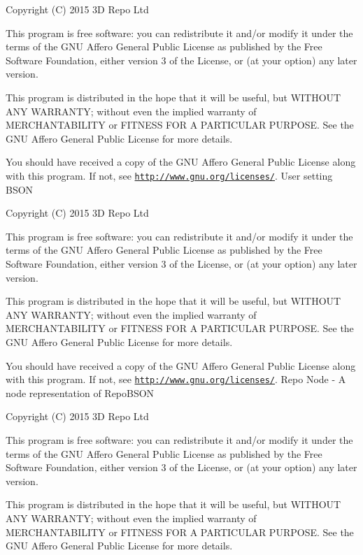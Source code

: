 Copyright (C) 2015 3\+D Repo Ltd

This program is free software\+: you can redistribute it and/or modify it under the terms of the G\+N\+U Affero General Public License as published by the Free Software Foundation, either version 3 of the License, or (at your option) any later version.

This program is distributed in the hope that it will be useful, but W\+I\+T\+H\+O\+U\+T A\+N\+Y W\+A\+R\+R\+A\+N\+T\+Y; without even the implied warranty of M\+E\+R\+C\+H\+A\+N\+T\+A\+B\+I\+L\+I\+T\+Y or F\+I\+T\+N\+E\+S\+S F\+O\+R A P\+A\+R\+T\+I\+C\+U\+L\+A\+R P\+U\+R\+P\+O\+S\+E. See the G\+N\+U Affero General Public License for more details.

You should have received a copy of the G\+N\+U Affero General Public License along with this program. If not, see \href{http://www.gnu.org/licenses/}{\tt http\+://www.\+gnu.\+org/licenses/}. User setting B\+S\+O\+N

Copyright (C) 2015 3\+D Repo Ltd

This program is free software\+: you can redistribute it and/or modify it under the terms of the G\+N\+U Affero General Public License as published by the Free Software Foundation, either version 3 of the License, or (at your option) any later version.

This program is distributed in the hope that it will be useful, but W\+I\+T\+H\+O\+U\+T A\+N\+Y W\+A\+R\+R\+A\+N\+T\+Y; without even the implied warranty of M\+E\+R\+C\+H\+A\+N\+T\+A\+B\+I\+L\+I\+T\+Y or F\+I\+T\+N\+E\+S\+S F\+O\+R A P\+A\+R\+T\+I\+C\+U\+L\+A\+R P\+U\+R\+P\+O\+S\+E. See the G\+N\+U Affero General Public License for more details.

You should have received a copy of the G\+N\+U Affero General Public License along with this program. If not, see \href{http://www.gnu.org/licenses/}{\tt http\+://www.\+gnu.\+org/licenses/}. Repo Node -\/ A node representation of Repo\+B\+S\+O\+N

Copyright (C) 2015 3\+D Repo Ltd

This program is free software\+: you can redistribute it and/or modify it under the terms of the G\+N\+U Affero General Public License as published by the Free Software Foundation, either version 3 of the License, or (at your option) any later version.

This program is distributed in the hope that it will be useful, but W\+I\+T\+H\+O\+U\+T A\+N\+Y W\+A\+R\+R\+A\+N\+T\+Y; without even the implied warranty of M\+E\+R\+C\+H\+A\+N\+T\+A\+B\+I\+L\+I\+T\+Y or F\+I\+T\+N\+E\+S\+S F\+O\+R A P\+A\+R\+T\+I\+C\+U\+L\+A\+R P\+U\+R\+P\+O\+S\+E. See the G\+N\+U Affero General Public License for more details.

